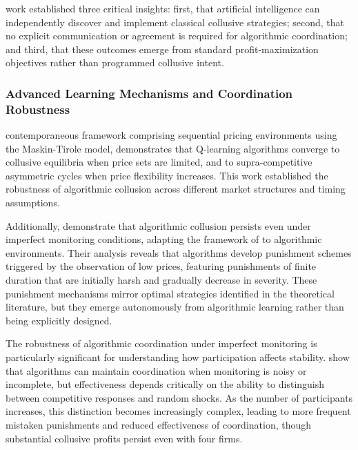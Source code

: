 \textcite{calvano_artificial_2020} work established three critical insights: first, that artificial intelligence can independently discover and implement classical collusive strategies; second, that no explicit communication or agreement is required for algorithmic coordination; and third, that these outcomes emerge from standard profit-maximization objectives rather than programmed collusive intent.

\subsubsection*{Advanced Learning Mechanisms and Coordination Robustness}

\textcite{klein_autonomous_2021} contemporaneous framework comprising sequential pricing environments using the Maskin-Tirole model, demonstrates that Q-learning algorithms converge to collusive equilibria when price sets are limited, and to supra-competitive asymmetric cycles when price flexibility increases. This work established the robustness of algorithmic collusion across different market structures and timing assumptions.

Additionally, \textcite{calvano_algorithmic_2021} demonstrate that algorithmic collusion persists even under imperfect monitoring conditions, adapting the framework of \textcite{green_noncooperative_1984} to algorithmic environments. Their analysis reveals that algorithms develop punishment schemes triggered by the observation of low prices, featuring punishments of finite duration that are initially harsh and gradually decrease in severity. These punishment mechanisms mirror optimal strategies identified in the theoretical literature, but they emerge autonomously from algorithmic learning rather than being explicitly designed.

The robustness of algorithmic coordination under imperfect monitoring is particularly significant for understanding how participation affects stability. \textcite{calvano_algorithmic_2021} show that algorithms can maintain coordination when monitoring is noisy or incomplete, but effectiveness depends critically on the ability to distinguish between competitive responses and random shocks. As the number of participants increases, this distinction becomes increasingly complex, leading to more frequent mistaken punishments and reduced effectiveness of coordination, though substantial collusive profits persist even with four firms.

